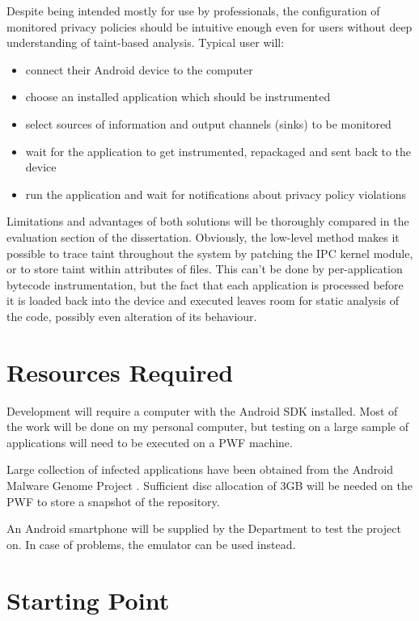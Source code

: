 \documentclass[12pt]{article}
\begin{document}
Despite being intended mostly for use by professionals, the configuration 
of monitored privacy policies should be intuitive enough even for users 
without deep understanding of taint-based analysis. Typical user will:
\begin{itemize}
\item{connect their Android device to the computer}
\item{choose an installed application which should be instrumented}
\item{select sources of information and output channels (sinks) to be
      monitored}
\item{wait for the application to get instrumented, repackaged and sent
      back to the device}
\item{run the application and wait for notifications about privacy policy
      violations}
\end{itemize}

Limitations and advantages of both solutions will be thoroughly 
compared in the evaluation section of the dissertation. Obviously, 
the low-level method makes it possible to trace taint throughout 
the system by patching the IPC kernel module, or to store taint within 
attributes of files. This can't be done by per-application bytecode 
instrumentation, but the fact that each application is processed before 
it is loaded back into the device and executed leaves room for static 
analysis of the code, possibly even alteration of its behaviour. 

\section*{Resources Required}

Development will require a computer with the Android SDK installed. Most 
of the work will be done on my personal computer, but testing on a large 
sample of applications will need to be executed on a PWF machine. 

Large collection of infected applications have been obtained from the
Android Malware Genome Project \cite{www.malgenomeproject.org}. 
Sufficient disc allocation of 3GB will be needed on the PWF to store
a snapshot of the repository. 

An Android smartphone will be supplied by the Department to test 
the project on. In case of problems, the emulator can be used instead.

\section*{Starting Point}
\end{document}
